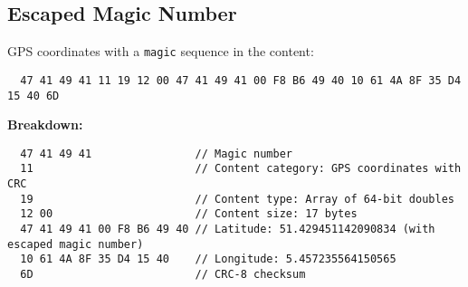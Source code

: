 \documentclass[a4paper]{article}
\begin{document}
\subsection*{Escaped Magic Number}
GPS coordinates with a \texttt{magic} sequence in the content:
\begin{verbatim}
  47 41 49 41 11 19 12 00 47 41 49 41 00 F8 B6 49 40 10 61 4A 8F 35 D4 15 40 6D
\end{verbatim}
\textbf{Breakdown:}
\begin{verbatim}
  47 41 49 41                // Magic number
  11                         // Content category: GPS coordinates with CRC
  19                         // Content type: Array of 64-bit doubles
  12 00                      // Content size: 17 bytes
  47 41 49 41 00 F8 B6 49 40 // Latitude: 51.429451142090834 (with escaped magic number)
  10 61 4A 8F 35 D4 15 40    // Longitude: 5.457235564150565
  6D                         // CRC-8 checksum
\end{verbatim}
\end{document}
